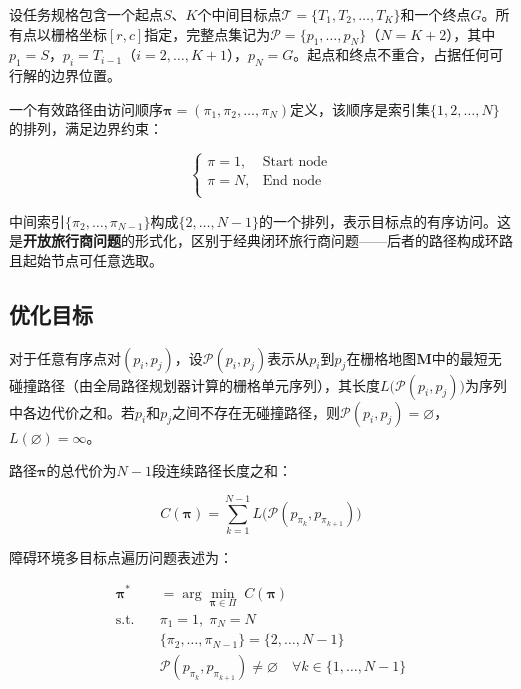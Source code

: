 \documentclass[lettersize,journal]{IEEEtran}
\begin{document}
\label{subsec:otspp}

设任务规格包含一个起点$S$、$K$个中间目标点$\mathcal{T} = \{T_1, T_2, \dots, T_K\}$和一个终点$G$。所有点以栅格坐标$[r, c]$指定，完整点集记为$\mathcal{P} = \{p_1, \dots, p_N\}$（$N = K + 2$），其中$p_1 = S$，$p_i = T_{i-1}$（$i = 2, \dots, K+1$），$p_N = G$。起点和终点不重合，占据任何可行解的边界位置。

一个有效路径由访问顺序$\bm{\pi} = (\pi_1, \pi_2, \dots, \pi_N)$定义，该顺序是索引集$\{1, 2, \dots, N\}$的排列，满足边界约束：

\begin{equation}
\begin{cases}
\pi = 1, & \text{Start node} \\
\pi = N, & \text{End node} \\
\end{cases}
\label{eq:boundary}
\end{equation}

中间索引$\{\pi_2, \dots, \pi_{N-1}\}$构成$\{2, \dots, N-1\}$的一个排列，表示目标点的有序访问。这是\textbf{开放旅行商问题}的形式化，区别于经典闭环旅行商问题——后者的路径构成环路且起始节点可任意选取\textcolor{blue}{\cite{ref4,ref36}}。

\subsection{优化目标}

对于任意有序点对$(p_i, p_j)$，设$\mathcal{P}(p_i, p_j)$表示从$p_i$到$p_j$在栅格地图$\mathbf{M}$中的最短无碰撞路径（由全局路径规划器计算的栅格单元序列），其长度$L\big(\mathcal{P}(p_i, p_j)\big)$为序列中各边代价之和。若$p_i$和$p_j$之间不存在无碰撞路径，则$\mathcal{P}(p_i, p_j) = \varnothing$，$L(\varnothing) = \infty$。

路径$\bm{\pi}$的总代价为$N-1$段连续路径长度之和：

\begin{equation}
C(\bm{\pi}) = \sum_{k=1}^{N-1} L\big(\mathcal{P}(p_{\pi_k}, p_{\pi_{k+1}})\big)
\label{eq:totalcost}
\end{equation}

障碍环境多目标点遍历问题表述为：

\begin{align}
\bm{\pi}^{*} &= \arg\min_{\bm{\pi} \in \Pi} \; C(\bm{\pi})
\label{eq:opt}\\
\text{s.t.} \quad &\pi_1 = 1,\; \pi_N = N \nonumber\\
&\{\pi_2, \dots, \pi_{N-1}\} = \{2, \dots, N-1\} \nonumber\\
&\mathcal{P}(p_{\pi_k}, p_{\pi_{k+1}}) \neq \varnothing \quad \forall k \in \{1, \dots, N-1\} \nonumber
\end{align}
\end{document}
